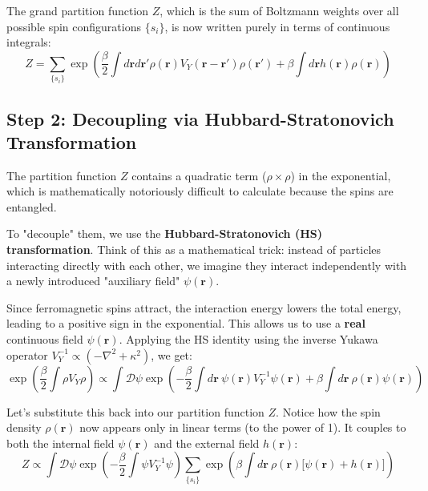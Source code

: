 \documentclass[12pt,a4paper]{article}
\begin{document}
The grand partition function $Z$, which is the sum of Boltzmann weights over all possible spin configurations $\{s_i\}$, is now written purely in terms of continuous integrals:
\begin{equation}
    Z = \sum_{\{s_i\}} \exp\left( \frac{\beta}{2} \int d\mathbf{r} d\mathbf{r}' \rho(\mathbf{r}) V_Y(\mathbf{r} - \mathbf{r}') \rho(\mathbf{r}') + \beta \int d\mathbf{r} h(\mathbf{r}) \rho(\mathbf{r}) \right)
\end{equation}

\subsection{Step 2: Decoupling via Hubbard-Stratonovich Transformation}
The partition function $Z$ contains a quadratic term ($\rho \times \rho$) in the exponential, which is mathematically notoriously difficult to calculate because the spins are entangled. 

To "decouple" them, we use the \textbf{Hubbard-Stratonovich (HS) transformation}. Think of this as a mathematical trick: instead of particles interacting directly with each other, we imagine they interact independently with a newly introduced "auxiliary field" $\psi(\mathbf{r})$. 

Since ferromagnetic spins attract, the interaction energy lowers the total energy, leading to a positive sign in the exponential. This allows us to use a \textbf{real} continuous field $\psi(\mathbf{r})$. Applying the HS identity using the inverse Yukawa operator $V_Y^{-1} \propto (-\nabla^2 + \kappa^2)$, we get:
\begin{equation}
    \exp\left( \frac{\beta}{2} \int \rho V_Y \rho \right) \propto \int \mathcal{D}\psi \exp\left( -\frac{\beta}{2} \int d\mathbf{r} \ \psi(\mathbf{r}) V_Y^{-1} \psi(\mathbf{r}) + \beta \int d\mathbf{r} \ \rho(\mathbf{r}) \psi(\mathbf{r}) \right)
\end{equation}

Let's substitute this back into our partition function $Z$. Notice how the spin density $\rho(\mathbf{r})$ now appears only in linear terms (to the power of 1). It couples to both the internal field $\psi(\mathbf{r})$ and the external field $h(\mathbf{r})$:
\begin{equation}
    Z \propto \int \mathcal{D}\psi \exp\left( -\frac{\beta}{2} \int \psi V_Y^{-1} \psi \right) \sum_{\{s_i\}} \exp\left( \beta \int d\mathbf{r} \ \rho(\mathbf{r}) \big[ \psi(\mathbf{r}) + h(\mathbf{r}) \big] \right)
\end{equation}
\end{document}

